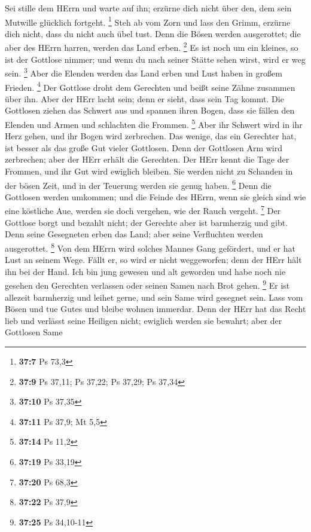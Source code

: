 Sei stille dem HErrn und warte auf ihn; erzürne dich nicht
über den, dem sein Mutwille glücklich fortgeht. \footnote{\textbf{37:7}
  Ps 73,3}  Steh ab vom Zorn und lass den Grimm, erzürne
dich nicht, dass du nicht auch übel tust.  Denn die Bösen
werden ausgerottet; die aber des HErrn harren, werden das Land erben.
\footnote{\textbf{37:9} Ps 37,11; Ps 37,22; Ps 37,29; Ps 37,34}
 Es ist noch um ein kleines, so ist der Gottlose nimmer;
und wenn du nach seiner Stätte sehen wirst, wird er weg sein.
\footnote{\textbf{37:10} Ps 37,35}  Aber die Elenden werden
das Land erben und Lust haben in großem Frieden. \footnote{\textbf{37:11}
  Ps 37,9; Mt 5,5}  Der Gottlose droht dem Gerechten und
beißt seine Zähne zusammen über ihn.  Aber der HErr lacht
sein; denn er sieht, dass sein Tag kommt.  Die Gottlosen
ziehen das Schwert aus und spannen ihren Bogen, dass sie fällen den
Elenden und Armen und schlachten die Frommen. \footnote{\textbf{37:14}
  Ps 11,2}  Aber ihr Schwert wird in ihr Herz gehen, und
ihr Bogen wird zerbrechen.  Das wenige, das ein Gerechter
hat, ist besser als das große Gut vieler Gottlosen.  Denn
der Gottlosen Arm wird zerbrechen; aber der HErr erhält die Gerechten.
 Der HErr kennt die Tage der Frommen, und ihr Gut wird
ewiglich bleiben.  Sie werden nicht zu Schanden in der
bösen Zeit, und in der Teuerung werden sie genug haben. \footnote{\textbf{37:19}
  Ps 33,19}  Denn die Gottlosen werden umkommen; und die
Feinde des HErrn, wenn sie gleich sind wie eine köstliche Aue, werden
sie doch vergehen, wie der Rauch vergeht. \footnote{\textbf{37:20} Ps
  68,3}  Der Gottlose borgt und bezahlt nicht; der Gerechte
aber ist barmherzig und gibt.  Denn seine Gesegneten erben
das Land; aber seine Verfluchten werden ausgerottet. \footnote{\textbf{37:22}
  Ps 37,9}  Von dem HErrn wird solches Mannes Gang
gefördert, und er hat Lust an seinem Wege.  Fällt er, so
wird er nicht weggeworfen; denn der HErr hält ihn bei der Hand.
 Ich bin jung gewesen und alt geworden und habe noch nie
gesehen den Gerechten verlassen oder seinen Samen nach Brot gehen.
\footnote{\textbf{37:25} Ps 34,10-11}  Er ist allezeit
barmherzig und leihet gerne, und sein Same wird gesegnet sein.
 Lass vom Bösen und tue Gutes und bleibe wohnen immerdar.
 Denn der HErr hat das Recht lieb und verlässt seine
Heiligen nicht; ewiglich werden sie bewahrt; aber der Gottlosen Same
